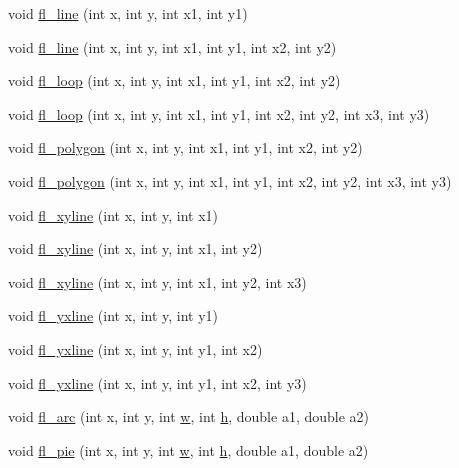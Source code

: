 \begin{DoxyCompactItemize}
\item 
void \hyperlink{group__fl__drawings_gaecc374f163a97ef67c4e58be11c47047}{fl\+\_\+line} (int x, int y, int x1, int y1)
\item 
void \hyperlink{group__fl__drawings_ga28cc7813255d063edbd116d51c55fb31}{fl\+\_\+line} (int x, int y, int x1, int y1, int x2, int y2)
\item 
void \hyperlink{group__fl__drawings_ga8043345daebed15378180c5c117930c8}{fl\+\_\+loop} (int x, int y, int x1, int y1, int x2, int y2)
\item 
void \hyperlink{group__fl__drawings_ga0670c9917da81b4fe67da44fd4fb4ab7}{fl\+\_\+loop} (int x, int y, int x1, int y1, int x2, int y2, int x3, int y3)
\item 
void \hyperlink{group__fl__drawings_ga821e9db88f1ff6a8d348c80babd7b49c}{fl\+\_\+polygon} (int x, int y, int x1, int y1, int x2, int y2)
\item 
void \hyperlink{group__fl__drawings_gab14ee2f4c5371ab6fe52bf08569e05d9}{fl\+\_\+polygon} (int x, int y, int x1, int y1, int x2, int y2, int x3, int y3)
\item 
void \hyperlink{group__fl__drawings_gacf46b232b6439424cc7f53656c5c2226}{fl\+\_\+xyline} (int x, int y, int x1)
\item 
void \hyperlink{group__fl__drawings_gaadf217672cf4e471ee184fab70736666}{fl\+\_\+xyline} (int x, int y, int x1, int y2)
\item 
void \hyperlink{group__fl__drawings_ga5098d1775b59ece7503a2faded1f1d74}{fl\+\_\+xyline} (int x, int y, int x1, int y2, int x3)
\item 
void \hyperlink{group__fl__drawings_ga814eabe0e8adf0a5017299cc2ecc26a1}{fl\+\_\+yxline} (int x, int y, int y1)
\item 
void \hyperlink{group__fl__drawings_ga9f5600eac117f72dd3fcb758729dab50}{fl\+\_\+yxline} (int x, int y, int y1, int x2)
\item 
void \hyperlink{group__fl__drawings_gae2e8c7095fbda86ce7812d7e74f1b153}{fl\+\_\+yxline} (int x, int y, int y1, int x2, int y3)
\item 
void \hyperlink{group__fl__drawings_ga3c1216fb40b6274acff72cca64b86a69}{fl\+\_\+arc} (int x, int y, int \hyperlink{forms_8_h_aac374e320caaadeca4874add33b62af2}{w}, int \hyperlink{forms_8_h_a7e427ba5b307f9068129699250690066}{h}, double a1, double a2)
\item 
void \hyperlink{group__fl__drawings_gab4085aba3817a699ad98e1c80f91b69a}{fl\+\_\+pie} (int x, int y, int \hyperlink{forms_8_h_aac374e320caaadeca4874add33b62af2}{w}, int \hyperlink{forms_8_h_a7e427ba5b307f9068129699250690066}{h}, double a1, double a2)

\end{DoxyCompactItemize}
